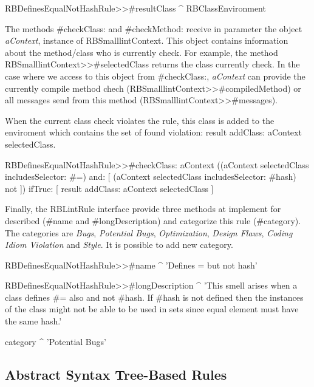 \documentclass[a4paper,10pt,twoside]{book}
\begin{document}
\begin{code}{}
RBDefinesEqualNotHashRule>>#resultClass
	^ RBClassEnvironment
\end{code}

The methods #checkClass: and #checkMethod: receive in parameter the object \emph{aContext},  instance of RBSmalllintContext. This object contains information about the method/class who is currently check. For example, the method RBSmalllintContext>>#selectedClass returns the class currently check. In the case where we access to this object from #checkClass:, \emph{aContext} can provide the currently compile method chech (RBSmalllintContext>>#compiledMethod) or all messages send from this method (RBSmalllintContext>>#messages).

When the current class check violates the rule, this class is added to the enviroment which contains the set of found violation: result addClass: aContext selectedClass. 

\begin{code}{}
RBDefinesEqualNotHashRule>>#checkClass: aContext 
	((aContext selectedClass includesSelector: #=) and: 
		[ (aContext selectedClass includesSelector: #hash) not ])
			 ifTrue: [ result addClass: aContext selectedClass ]
\end{code}



Finally, the RBLintRule interface provide three methods at implement for described (#name and #longDescription) and categorize this rule (#category). The categories are \emph{Bugs}, \emph{Potential Bugs}, \emph{Optimization}, \emph{Design Flaws}, \emph{Coding Idiom Violation} and \emph{Style}. It is possible to add new category.
\begin{code}{}
RBDefinesEqualNotHashRule>>#name
	^ 'Defines = but not hash'
\end{code}

\begin{code}{}
RBDefinesEqualNotHashRule>>#longDescription
	^ 'This smell arises when a class defines #= also and not #hash. If #hash is not defined then the instances of the class might not be able to be used in sets since equal element must have the same hash.'
\end{code}

\begin{code}{}
category 
	^ 'Potential Bugs'
\end{code}

\subsection{Abstract Syntax Tree-Based Rules}
\end{document}
